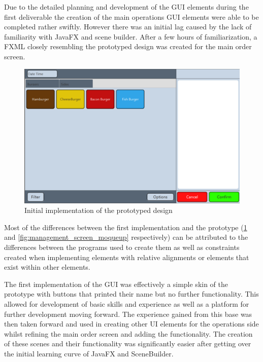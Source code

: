 
Due to the detailed planning and development of the GUI elements during the first deliverable the creation of the main operations GUI elements were able to be completed rather swiftly. However there was an initial lag caused by the lack of familiarity with JavaFX and scene builder. After a few hours of familiarization, a FXML closely resembling the prototyped design was created for the main order screen. 

\begin{figure}[ht]
	\centering
	\includegraphics[width=150mm]{images/old_order_screen.png}
	\caption{Initial implementation of the prototyped design}
	\label{fig:old_order_screen}
\end{figure}

Most of the differences between the first implementation and the prototype (\ref{fig:old_order_screen} and \ref{fig:management_screen_moqueup} respectively) can be attributed to the differences between the programs used to create them as well as constraints created when implementing elements with relative alignments or elements that exist within other elements. 

The first implementation of the GUI was effectively a simple skin of the prototype with buttons that printed their name but no further functionality. This allowed for development of basic skills and experience as well as a platform for further development moving forward. The experience gained from this base was then taken forward and used in creating other UI elements for the operations side whilst refining the main order screen and adding the functionality. The creation of these scenes and their functionality was significantly easier after getting over the initial learning curve of JavaFX and SceneBuilder.

